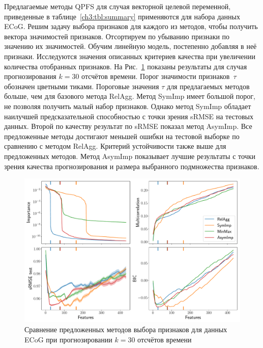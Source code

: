 Предлагаемые методы QPFS для случая векторной целевой переменной, приведенные в таблице~\ref{ch3:tbl:summary} применяются для набора данных ECoG. 
Решим задачу выбора признаков для каждого из методов, чтобы получить вектора значимостей признаков. 
Отсортируем по убыванию признаки по значению их значимостей. Обучим линейную модель, постепенно добавляя в неё признаки. 
Исследуются значения описанных критериев качества при увеличении количества отобранных признаков. 
На Рис.~\ref{ch3:fig:ecog_3_30_metrics} показаны результаты для случая прогнозирования $k = 30$ отсчётов времени. 
Порог значимости признаков~$\tau$ обозначен цветными тиками. 
Пороговые значения $\tau$ для предлагаемых методов больше, чем для базового метода RelAgg. 
Метод SymImp имеет большой порог, не позволяя получить малый набор признаков.
Однако метод SymImp обладает наилучшей предсказательной способностью с точки зрения sRMSE на тестовых данных.
Второй по качеству результат по sRMSE показал метод AsymImp.
Все предложенные методы достигают меньшей ошибки на тестовой выборке по сравнению с методом RelAgg. 
Критерий устойчивости также выше для предложенных методов.
Метод AsymImp показывает лучшие результаты с точки зрения качества прогнозирования и размера выбранного подмножества признаков.

\begin{figure}[ht]
	\includegraphics[width=\linewidth]{figs/ch3/ecog_3_30_metrics}
	\caption{Сравнение предложенных методов выбора признаков для данных ECoG при прогнозировании $k = 30$ отсчётов времени}
	\label{ch3:fig:ecog_3_30_metrics}
\end{figure}

